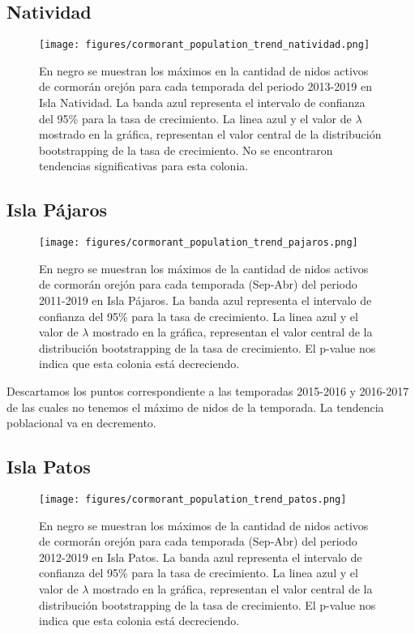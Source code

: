 \documentclass{article} %
\begin{document}
\subsection*{Natividad}

\begin{figure}[H]
\hspace{-2cm}
    \texttt{[image: figures/cormorant\_population\_trend\_natividad.png]}
\caption{En negro se muestran los máximos en la cantidad de nidos activos de cormorán orejón para cada temporada del periodo 2013-2019 en Isla Natividad. La banda azul representa el intervalo de confianza del 95\% para la tasa de crecimiento. La linea azul y el valor de $\lambda$ mostrado en la gráfica, representan el valor central de la distribución bootstrapping de la tasa de crecimiento. No se encontraron tendencias significativas para esta colonia.}
\end{figure}

\subsection*{Isla Pájaros}

\begin{figure}[H]
\hspace{-2cm}
    \texttt{[image: figures/cormorant\_population\_trend\_pajaros.png]}
\caption{En negro se muestran los máximos de la cantidad de nidos activos de cormorán orejón para cada temporada (Sep-Abr) del periodo 2011-2019 en Isla Pájaros. La banda azul representa el intervalo de confianza del 95\% para la tasa de crecimiento. La linea azul y el valor de $\lambda$ mostrado en la gráfica, representan el valor central de la distribución bootstrapping de la tasa de crecimiento. El p-value nos indica que esta colonia está decreciendo.}
\end{figure}

Descartamos los puntos correspondiente a las temporadas 2015-2016 y 2016-2017 de las cuales no tenemos el máximo de nidos de la temporada. La tendencia poblacional va en decremento.


\subsection*{Isla Patos}

\begin{figure}[H]
\hspace{-2cm}
    \texttt{[image: figures/cormorant\_population\_trend\_patos.png]}
\caption{En negro se muestran los máximos de la cantidad de nidos activos de cormorán orejón para cada temporada (Sep-Abr) del periodo 2012-2019 en Isla Patos. La banda azul representa el intervalo de confianza del 95\% para la tasa de crecimiento. La linea azul y el valor de $\lambda$ mostrado en la gráfica, representan el valor central de la distribución bootstrapping de la tasa de crecimiento. El p-value nos indica que esta colonia está decreciendo.}
\end{figure}
\end{document}

